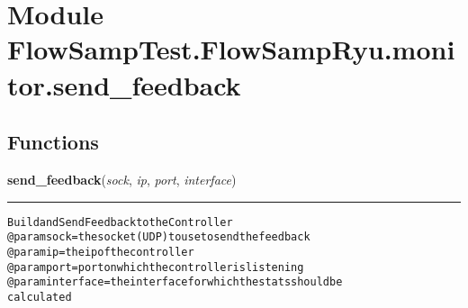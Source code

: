 %
%
%


\section{Module FlowSampTest.FlowSampRyu.monitor.send\_feedback}

    \label{FlowSampTest:FlowSampRyu:monitor:send_feedback}


  \subsection{Functions}

    \label{FlowSampTest:FlowSampRyu:monitor:send_feedback:send_feedback}

    \vspace{0.5ex}

\hspace{.8\funcindent}\begin{boxedminipage}{\funcwidth}

    \raggedright \textbf{send\_feedback}(\textit{sock}, \textit{ip}, \textit{port}, \textit{interface})

    \vspace{-1.5ex}

    \rule{\textwidth}{0.5\fboxrule}
\setlength{\parskip}{2ex}
\begin{alltt}
Build and Send Feedback to the Controller
@param sock = the socket (UDP) to use to send the feedback
@param ip = the ip of the controller
@param port = port on which the controller is listening
@param interface = the interface for which the stats should be
                   calculated
\end{alltt}

\setlength{\parskip}{1ex}
    \end{boxedminipage}

